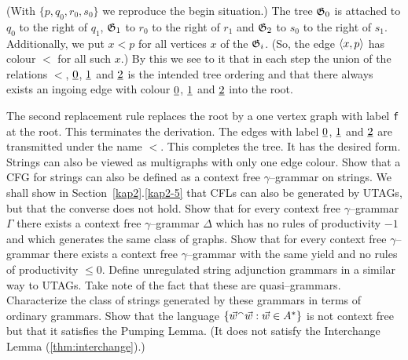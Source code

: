 (With $\{p,q_0, r_0, s_0\}$ we reproduce the begin situation.)
The tree $\mathfrak{G}_0$ is attached to $q_0$ to the right of $q_1$,
$\mathfrak{G}_1$ to $r_0$ to the right of $r_1$ and
$\mathfrak{G}_2$ to $s_0$ to the right of $s_1$.
Additionally, we put $x < p$ for all vertices $x$ of the $\mathfrak{G}_i$.
(So, the edge $\langle x, p\rangle$ has colour $<$ for all such $x$.)
By this we see to it that in each step the union of the
relations $<$, $\underline{0}$, $\underline{1}$ and $\underline{2}$ is the
intended tree ordering and that there always exists
an ingoing edge with colour $\underline{0}$, $\underline{1}$ and
$\underline{2}$ into the root.

The second replacement rule replaces the root
by a one vertex graph with label {\tt f} at the root.
This terminates the derivation. The edges with label
$\underline{0}$, $\underline{1}$ and $\underline{2}$ are transmitted under the
name $<$. This completes the tree. It has the desired form.
\vplatz
\exercise
Strings can also be viewed as multigraphs with only one edge 
colour. Show that a CFG for strings can also be defined as a 
context free $\gamma$--grammar on strings. We shall show in 
Section~\ref{kap2}.\ref{kap2-5} that CFLs can also be generated by UTAGs,
but that the converse does not hold.
\vplatz
\exercise
Show that for every context free $\gamma$--grammar $\Gamma$
there exists a context free  $\gamma$--grammar $\Delta$
which has no rules of productivity $- 1$ and which generates
the same class of graphs.
\vplatz
\exercise
Show that for every context free $\gamma$--grammar there exists
a context free $\gamma$--grammar with the same yield and no
rules of productivity $\leq 0$.
\vplatz
\exercise
Define unregulated string adjunction grammars in a similar way to 
UTAGs. Take note of the fact that these are quasi--grammars. Characterize 
the class of strings generated  by these grammars in terms of 
ordinary grammars.
\vplatz %
\exercise %
Show that the language $\{\vec{w} {^{\smallfrown}} \vec{w}
: \vec{w} \in A^{\ast}\}$ is not context free but that it
satisfies the Pumping Lemma. 
(It does not satisfy the Interchange Lemma (\ref{thm:interchange}).)
